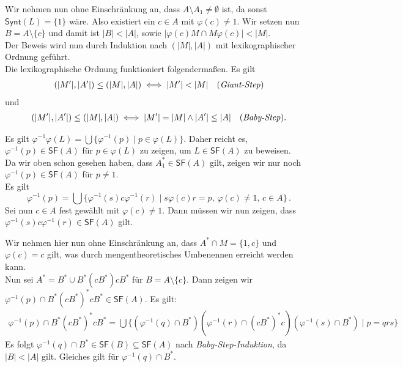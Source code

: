 \documentclass[12pt, german]{article}
\newcommand{\inv}{^{-1}}
\newcommand{\starfree}{\mathsf{SF}}
\newcommand{\synt}{\mathsf{Synt}}
\newcommand{\aast}{A^{\ast}}
\newcommand{\bast}{B^{\ast}}
\begin{document}
	Wir nehmen nun ohne Einschränkung an, dass $A\setminus A_1 \not = \emptyset$ ist, da sonst $\synt(L) = \{1\}$ wäre. Also existiert ein $c \in A$ mit $\varphi(c) \not = 1$. Wir setzen nun $B = A \setminus \{c\}$ und damit ist $|B| < |A|$, sowie $|\varphi(c)M \cap M\varphi(c)|< |M|$. \\
	
	Der Beweis wird nun durch Induktion nach $(|M|, |A|)$ mit lexikographischer Ordnung geführt. \\
	Die lexikographische Ordnung funktioniert folgenderma\ss en. Es gilt
	\begin{align*}
		(|M'|, |A'|) \leq (|M|, |A|) \iff |M'| < |M|\quad \text{(\textit{Giant-Step})}
	\end{align*}
	und  
	\begin{align*}
		(|M'|, |A'|) \leq (|M|, |A|) \iff |M'| = |M| \wedge |A'| \leq |A|  \quad \text{(\textit{Baby-Step})}.
	\end{align*}
	\newline
	
	Es gilt $\varphi\inv\varphi(L) = \bigcup \{\varphi\inv(p) \mid p \in \varphi(L)\}$. Daher reicht es, $ \varphi\inv(p) \in \starfree(A)$ für $p \in \varphi(L)$ zu zeigen, um $L \in \starfree(A)$ zu beweisen. \\ 

	
	Da wir oben schon gesehen haben, dass $\aast_1 \in \starfree(A)$ gilt, zeigen wir nur noch $\varphi\inv(p) \in \starfree(A)$ für $p \not = 1$.  \\
	
	Es gilt $$\varphi\inv(p) = \bigcup \{\varphi\inv (s) c \varphi\inv(r) \mid s\varphi(c)r = p, \, \varphi(c) \not = 1, \, c \in A\}\, .$$
	Sei nun $c\in A$ fest gewählt mit $\varphi(c) \not = 1$. Dann müssen wir nun zeigen, dass $\varphi\inv(s)c\varphi\inv(r) \in \starfree(A)$ gilt. 
	\newline
	
	Wir nehmen hier nun ohne Einschränkung an, dass $\aast \cap M = \{1, c\}$ und $\varphi(c)=c$ gilt, was durch mengentheoretisches Umbenennen erreicht werden kann. \\
	Nun sei $\aast = \bast \cup \bast (c \bast) c \bast$ für $B = A \setminus \{c\}$.
	Dann zeigen wir $\varphi\inv(p) \cap \bast(c\bast)^\ast c\bast \in \starfree(A)$. 
	Es gilt:
	\begin{align*}
		\varphi\inv(p) \cap \bast(c\bast)^\ast c\bast = \bigcup \{(\varphi\inv(q) \cap \bast)(\varphi\inv(r)\cap(c\bast)^\ast c) (\varphi\inv(s) \cap \bast) \mid p = qrs\}
	\end{align*} 
	Es folgt $\varphi\inv(q) \cap \bast \in \starfree(B) \subseteq \starfree(A)$ nach \textit{Baby-Step-Induktion}, da $|B| < |A|$ gilt. 
	Gleiches gilt für $\varphi\inv(q) \cap \bast$.
	\newline
	
\end{document}
